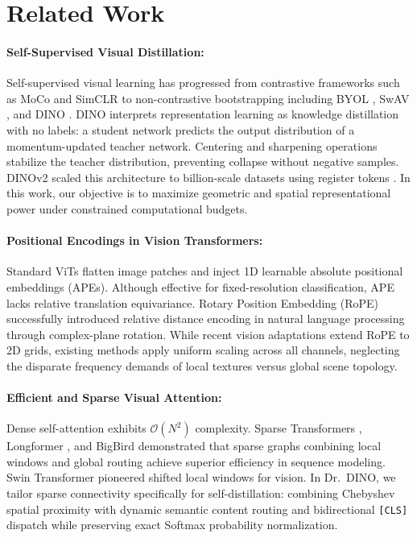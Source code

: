 \documentclass[11pt,a4paper]{article}
\begin{document}
\section{Related Work}
\label{sec:related}

\paragraph{Self-Supervised Visual Distillation:} Self-supervised visual learning has progressed from contrastive frameworks such as MoCo \cite{he2020momentum, chen2021mocov3} and SimCLR to non-contrastive bootstrapping including BYOL \cite{grill2020byol}, SwAV \cite{caron2020swav}, and DINO \cite{caron2021emerging}. DINO interprets representation learning as knowledge distillation with no labels: a student network predicts the output distribution of a momentum-updated teacher network. Centering and sharpening operations stabilize the teacher distribution, preventing collapse without negative samples. DINOv2 \cite{oquab2023dinov2} scaled this architecture to billion-scale datasets using register tokens \cite{darcet2024vision}. In this work, our objective is to maximize geometric and spatial representational power under constrained computational budgets.

\paragraph{Positional Encodings in Vision Transformers:} Standard ViTs \cite{dosovitskiy2020image} flatten image patches and inject 1D learnable absolute positional embeddings (APEs). Although effective for fixed-resolution classification, APE lacks relative translation equivariance. Rotary Position Embedding (RoPE) \cite{su2024roformer} successfully introduced relative distance encoding in natural language processing through complex-plane rotation. While recent vision adaptations extend RoPE to 2D grids, existing methods apply uniform scaling across all channels, neglecting the disparate frequency demands of local textures versus global scene topology.

\paragraph{Efficient and Sparse Visual Attention:} Dense self-attention exhibits $\mathcal{O}(N^2)$ complexity. Sparse Transformers \cite{child2019generating}, Longformer \cite{beltagy2020longformer}, and BigBird \cite{zaheer2020bigbird} demonstrated that sparse graphs combining local windows and global routing achieve superior efficiency in sequence modeling. Swin Transformer \cite{liu2021swin} pioneered shifted local windows for vision. In Dr.\ DINO, we tailor sparse connectivity specifically for self-distillation: combining Chebyshev spatial proximity with dynamic semantic content routing and bidirectional \texttt{[CLS]} dispatch while preserving exact Softmax probability normalization.
\end{document}
